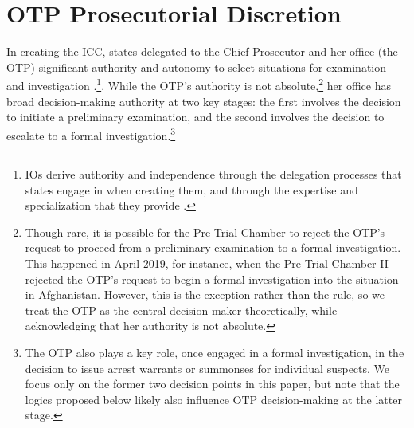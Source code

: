 \section*{OTP Prosecutorial Discretion}

In creating the ICC, states delegated to the Chief Prosecutor and her office (the OTP) significant authority and autonomy to select situations for examination and investigation \citep{danner2003enhancing, schabas2011introduction, stahn2009judicial}.\footnote{IOs derive authority and independence through the delegation processes that states engage in when creating them, and through the expertise and specialization that they provide \citep{barnett1999politics, barnett2004rules, beardsley2012following,finnemore2009legitimacy,  haftel2006independence}.}. While the OTP's authority is not absolute,\footnote{Though rare, it is possible for the Pre-Trial Chamber to reject the OTP's request to proceed from a preliminary examination to a formal investigation. This happened in April 2019, for instance, when the Pre-Trial Chamber II rejected the OTP's request to begin a formal investigation into the situation in Afghanistan. However, this is the exception rather than the rule, so we treat the OTP as the central decision-maker theoretically, while acknowledging that her authority is not absolute.} her office has broad decision-making authority at two key stages: the first involves the decision to initiate a preliminary examination, and the second involves the decision to escalate to a formal investigation.\footnote{The OTP also plays a key role, once engaged in a formal investigation, in the decision to issue arrest warrants or summonses for individual suspects. We focus only on the former two decision points in this paper, but note that the logics proposed below likely also influence OTP decision-making at the latter stage.}

